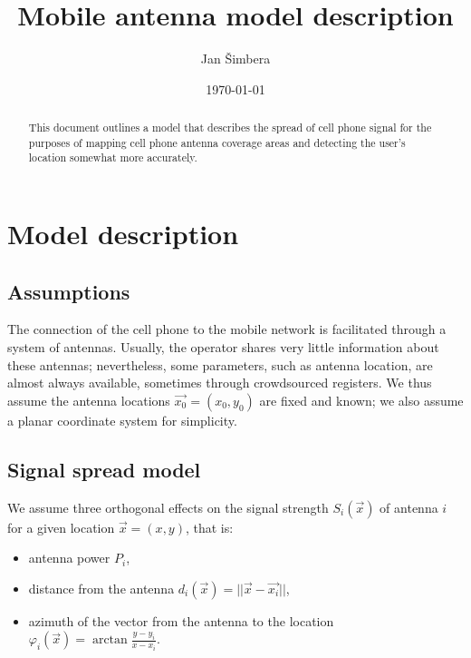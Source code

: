 \documentclass[a4paper]{article}
\title{Mobile antenna model description}
\author{Jan Šimbera}
\date{\today}
\begin{document}
\maketitle
\begin{abstract}
This document outlines a model that describes the spread of cell phone signal
for the purposes of mapping cell phone antenna coverage areas and detecting
the user's location somewhat more accurately.
\end{abstract}


\section{Model description} \label{sec:antmodel}

\subsection{Assumptions}
The connection of the cell phone to the mobile network is facilitated through
a system of antennas. Usually, the operator shares very little information
about these antennas; nevertheless, some parameters, such as antenna location,
are almost always available, sometimes through crowdsourced registers. We thus
assume the antenna locations $\vec{x_0} = (x_0,y_0)$ are fixed and known; we
also assume a planar coordinate system for simplicity.

\subsection{Signal spread model}\label{sec:sigmodel}
We assume three orthogonal effects on the signal strength $S_i(\vec{x})$
of antenna $i$ for a given location $\vec{x} = (x,y)$, that is:
\begin{itemize}
\item antenna power $P_i$,
\item distance from the antenna $d_i(\vec{x}) = ||\vec{x} - \vec{x_i}||$,
\item azimuth of the vector from the antenna to the location
    $\varphi_i(\vec{x}) = \arctan{\frac{y - y_i}{x - x_i}}$.
\end{itemize}
\end{document}
